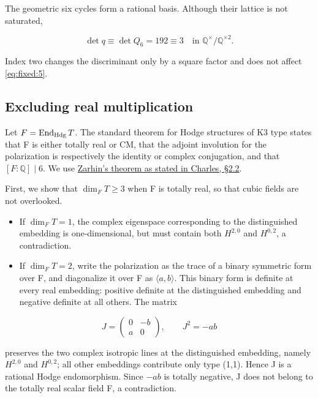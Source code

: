 \documentclass[11pt,a4paper,oneside]{article}
\theoremstyle{plain}
\theoremstyle{definition}
\theoremstyle{remark}
\newcommand{\tightlist}{\setlength{\itemsep}{0pt}\setlength{\parskip}{0pt}}
\numberwithin{equation}{section}
\begin{document}
The geometric six cycles form a rational basis. Although their lattice is not saturated,

\begin{equation}
\det q\equiv\det Q_6=192\equiv3
 \quad\text{in }\mathbb Q^\times/\mathbb Q^{\times2}.             \label{eq:fixed:5}
\end{equation}

Index two changes the discriminant only by a square factor and does not affect \eqref{eq:fixed:5}.


\subsection{Excluding real multiplication}\label{sec:fixed:2}

Let \(F=\operatorname{End}_{\rm Hdg}T\). The standard theorem for Hodge structures of K3 type states that F is either totally real or CM, that the adjoint involution for the polarization is respectively the identity or complex conjugation, and that \([F:\mathbb Q]\mid6\). We use \href{https://www.imo.universite-paris-saclay.fr/~francois.charles/Picard.pdf}{Zarhin's theorem as stated in Charles, §2.2}.

First, we show that \(\dim_FT\ge3\) when F is totally real, so that cubic fields are not overlooked.

\begin{itemize}
\tightlist
\item
  If \(\dim_FT=1\), the complex eigenspace corresponding to the distinguished embedding is one-dimensional, but must contain both \(H^{2,0}\) and \(H^{0,2}\), a contradiction.
\item
  If \(\dim_FT=2\), write the polarization as the trace of a binary symmetric form over F, and diagonalize it over F as \(\langle a,b\rangle\). This binary form is definite at every real embedding: positive definite at the distinguished embedding and negative definite at all others. The matrix
\end{itemize}

\begin{equation}
J=\begin{pmatrix}0&-b\\a&0\end{pmatrix},\qquad J^2=-ab
\end{equation}

preserves the two complex isotropic lines at the distinguished embedding, namely \(H^{2,0}\) and \(H^{0,2}\); all other embeddings contribute only type (1,1). Hence J is a rational Hodge endomorphism. Since \(-ab\) is totally negative, J does not belong to the totally real scalar field F, a contradiction.
\end{document}
